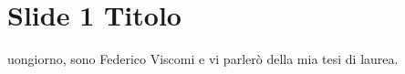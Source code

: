 \section{Slide 1 Titolo}
uongiorno, sono Federico Viscomi e vi parler\`o della mia tesi di laurea.
\vspace{0.7cm}